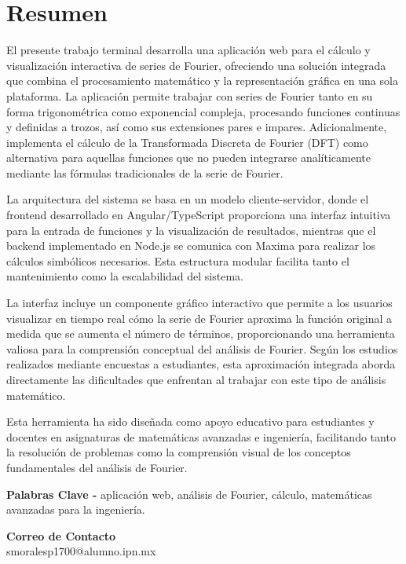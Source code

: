 \chapter{Resumen}
El presente trabajo terminal desarrolla una aplicación web para el cálculo y visualización interactiva de series de Fourier, ofreciendo una solución integrada que combina el procesamiento matemático y la representación gráfica en una sola plataforma. La aplicación permite trabajar con series de Fourier tanto en su forma trigonométrica como exponencial compleja, procesando funciones continuas y definidas a trozos, así como sus extensiones pares e impares. Adicionalmente, implementa el cálculo de la Transformada Discreta de Fourier (DFT) como alternativa para aquellas funciones que no pueden integrarse analíticamente mediante las fórmulas tradicionales de la serie de Fourier.

La arquitectura del sistema se basa en un modelo cliente-servidor, donde el frontend desarrollado en Angular/TypeScript proporciona una interfaz intuitiva para la entrada de funciones y la visualización de resultados, mientras que el backend implementado en Node.js se comunica con Maxima para realizar los cálculos simbólicos necesarios. Esta estructura modular facilita tanto el mantenimiento como la escalabilidad del sistema.

La interfaz incluye un componente gráfico interactivo que permite a los usuarios visualizar en tiempo real cómo la serie de Fourier aproxima la función original a medida que se aumenta el número de términos, proporcionando una herramienta valiosa para la comprensión conceptual del análisis de Fourier. Según los estudios realizados mediante encuestas a estudiantes, esta aproximación integrada aborda directamente las dificultades que enfrentan al trabajar con este tipo de análisis matemático.

Esta herramienta ha sido diseñada como apoyo educativo para estudiantes y docentes en asignaturas de matemáticas avanzadas e ingeniería, facilitando tanto la resolución de problemas como la comprensión visual de los conceptos fundamentales del análisis de Fourier.

\vspace{0.5cm}

\textbf{Palabras Clave -} aplicación web, análisis de Fourier, cálculo, matemáticas avanzadas para la ingeniería.

\vspace{0.5cm}

\textbf{Correo de Contacto} \\
smoralesp1700@alumno.ipn.mx \\

